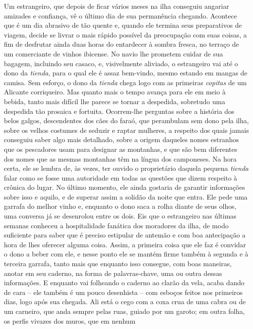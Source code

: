 Um estrangeiro, que depois de ficar vários meses na ilha conseguiu
angariar amizades e confiança, vê o último dia de sua permanência
chegando. Acontece que é um dia abrasivo de tão quente e, quando ele
termina seus preparativos de viagem, decide se livrar o mais rápido
possível da preocupação com suas coisas, a fim de desfrutar ainda duas
horas do entardecer à sombra fresca, no terraço de um comerciante de
vinhos ibicense. No navio lhe prometem cuidar de sua bagagem, incluindo
seu casaco, e, visivelmente aliviado, o estrangeiro vai até o dono da
\emph{tienda}, para o qual ele é assaz bem-vindo, mesmo estando em
mangas de camisa. Sem esforço, o dono da \emph{tienda} chega logo com as
primeiras \emph{copitas} de um Alicante corriqueiro. Mas quanto mais o
tempo avança para ele em meio à bebida, tanto mais difícil lhe parece se
tornar a despedida, sobretudo uma despedida tão prosaica e fortuita.
Ocorrem-lhe perguntas sobre a história dos belos galgos, descendentes
dos cães do faraó, que perambulam sem dono pela ilha, sobre os velhos
costumes de seduzir e raptar mulheres, a respeito dos quais jamais
conseguiu saber algo mais detalhado, sobre a origem daqueles nomes
estranhos que os pescadores usam para designar as montanhas, e que são
bem diferentes dos nomes que as mesmas montanhas têm na língua dos
camponeses. Na hora certa, ele se lembra de, às vezes, ter ouvido o
proprietário daquela pequena \emph{tienda} falar como se fosse uma
autoridade em todas as questões que dizem respeito à crônica do lugar.
No último momento, ele ainda gostaria de garantir informações sobre isso
e aquilo, e de superar assim a solidão da noite que entra. Ele pede uma
garrafa do melhor vinho e, enquanto o dono saca a rolha diante de seus
olhos, uma conversa já se desenrolou entre os dois. Eis que o
estrangeiro nas últimas semanas conheceu a hospitalidade fanática dos
moradores da ilha, de modo suficiente para saber que é preciso estipular
de antemão e com boa antecipação a hora de lhes oferecer alguma coisa.
Assim, a primeira coisa que ele faz é convidar o dono a beber com ele, e
nesse ponto ele se mantém firme também à segunda e à terceira garrafa,
tanto mais que enquanto isso consegue, com boas maneiras, anotar em seu
caderno, na forma de palavras-chave, uma ou outra dessas informações. E
enquanto vai folheando o caderno ao clarão da vela, acaba dando de cara
-- ele também é um pouco desenhista -- com esboços feitos nos primeiros
dias, logo após sua chegada. Ali está o cego com a coxa crua de uma
cabra ou de um carneiro, que anda sempre pelas ruas, guiado por um
garoto; em outra folha, os perfis vivazes dos muros, que em nenhum
